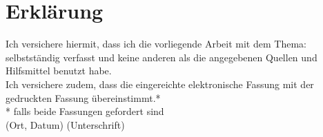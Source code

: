 \section*{Erklärung}
Ich versichere hiermit, dass ich die vorliegende Arbeit mit dem Thema: \emph{\thetitle} selbstständig verfasst und keine anderen als die angegebenen Quellen und Hilfsmittel benutzt habe. \\

Ich versichere zudem, dass die eingereichte elektronische Fassung mit der gedruckten Fassung übereinstimmt.* \\

* falls beide Fassungen gefordert sind
$\;$ \\
$\;$ \\
$\;$ \\
$\;$ \\
$\;$ \\
(Ort, Datum) \hspace{75mm} (Unterschrift)


